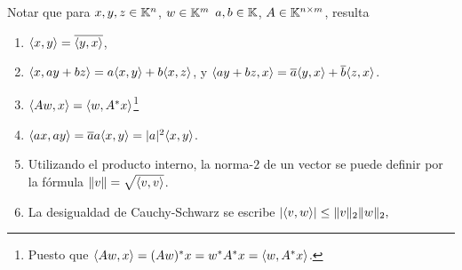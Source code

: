 \tcc
\begin{rem}
\label{obs:interno}
Notar que para $\xb,\yb,\zb \in \K^n$, $\wb\in \K^m$ $a,b \in \mathbb K$,  $\Ab\in \K^{n \times m}$, resulta

\begin{enumerate}
\item   $\langle \xb, \yb \rangle= \overline{\langle \yb, \xb \rangle}$,
\item   $\langle \xb, a\yb + b\zb \rangle = a \langle \xb, \yb \rangle + b \langle \xb, \zb \rangle$,  y $\langle a\yb + b\zb,\xb \rangle = \overline{a} \langle \yb, \xb \rangle + \overline{b} \langle \zb, \xb \rangle$.
\item  $\langle \Ab\wb, \xb \rangle = \langle  \wb,\Ab^* \xb \rangle$\footnote{Puesto que $\langle \Ab\wb, \xb \rangle = (\Ab\wb)^*\xb=\wb^*\Ab^*\xb= \langle  \wb,\Ab^* \xb \rangle$.}
  \item $\langle a\xb, a\yb \rangle = \overline{a}a \langle \xb, \yb \rangle=|a|^2 \langle \xb, \yb \rangle$.
\item  Utilizando el producto interno, la norma-$2$ de un vector se puede definir por la fórmula $\|\vb\| = \sqrt{\langle \vb, \vb\rangle}$.
\item La desigualdad de Cauchy-Schwarz se escribe
$|\langle \vb,\wb\rangle|\le \|\vb\|_2\|\wb\|_2,$
 \end{enumerate}
\end{rem}
\etcc

